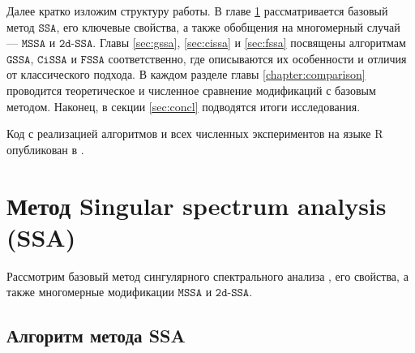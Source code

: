 \documentclass[12pt, specialist, subf
]{disser}
\theoremstyle{definition}
\newcommand{\SSA}{\texttt{SSA}}
\newcommand{\GSSA}{\texttt{GSSA}}
\newcommand{\CISSA}{\texttt{CiSSA}}
\newcommand{\MSSA}{\texttt{MSSA}}
\newcommand{\FSSA}{\texttt{FSSA}}
\newcommand{\DSSA}{\texttt{2d-SSA}}
\newcommand{\TS}{\mathsf{X}}
\newtheorem{comment}{Замечание} %
\begin{document}

Далее кратко изложим структуру работы. В главе \ref{sec:ssa} рассматривается базовый метод $\SSA$, его ключевые свойства, а также обобщения на многомерный случай — $\MSSA$ и $\DSSA$.  
Главы \ref{sec:gssa}, \ref{sec:cissa} и \ref{sec:fssa} посвящены алгоритмам $\GSSA$, $\CISSA$ и $\FSSA$ соответственно, где описываются их особенности и отличия от классического подхода.  
В каждом разделе главы \ref{chapter:comparison} проводится теоретическое и численное сравнение модификаций с базовым методом.  
Наконец, в секции \ref{sec:concl} подводятся итоги исследования.

Код с реализацией алгоритмов и всех численных экспериментов на языке R опубликован в \cite{spbu_cissa_coursework_github}.



\newpage

\chapter{Метод Singular spectrum analysis (SSA)}
\label{sec:ssa}


Рассмотрим базовый метод сингулярного спектрального анализа \cite{golyandina2001analysis}, его свойства, а также многомерные модификации $\MSSA$ и $\DSSA$.

\section{Алгоритм метода SSA}
\end{document}
